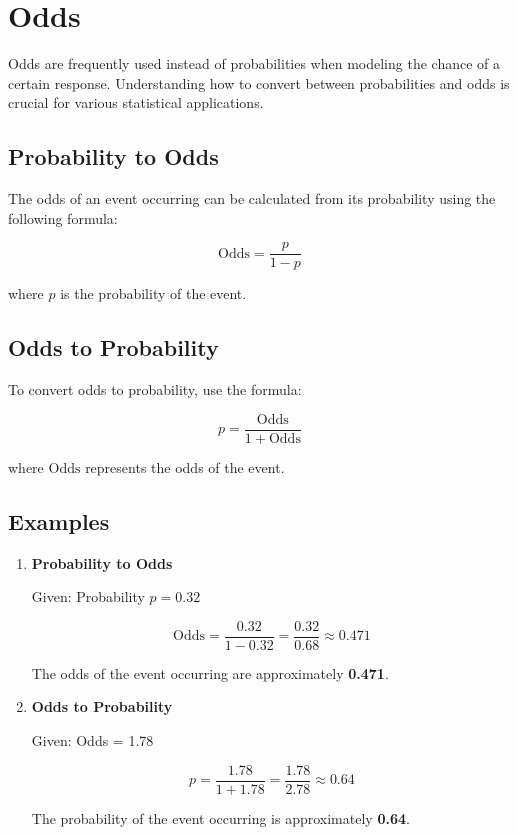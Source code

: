 \documentclass{article}
\begin{document}
\section{Odds}

Odds are frequently used instead of probabilities when modeling the chance of a certain response. Understanding how to convert between probabilities and odds is crucial for various statistical applications.

\subsection{Probability to Odds}

The odds of an event occurring can be calculated from its probability using the following formula:

\[
\text{Odds} = \frac{p}{1 - p}
\]

where \( p \) is the probability of the event.

\subsection{Odds to Probability}

To convert odds to probability, use the formula:

\[
p = \frac{\text{Odds}}{1 + \text{Odds}}
\]

where \(\text{Odds}\) represents the odds of the event.

\subsection{Examples}

\begin{enumerate}
    \item \textbf{Probability to Odds}
    
    Given: Probability \( p = 0.32 \)

    \[
    \text{Odds} = \frac{0.32}{1 - 0.32} = \frac{0.32}{0.68} \approx 0.471
    \]

    The odds of the event occurring are approximately \textbf{0.471}.

    \item \textbf{Odds to Probability}
    
    Given: Odds = 1.78

    \[
    p = \frac{1.78}{1 + 1.78} = \frac{1.78}{2.78} \approx 0.64
    \]

    The probability of the event occurring is approximately \textbf{0.64}.
\end{enumerate}
\end{document}
